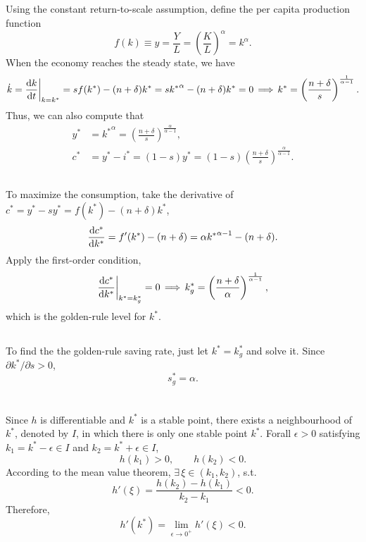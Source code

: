 \documentclass{article}
\newcommand{\kast}{k^\ast}
\newcommand{\yast}{y^\ast}
\newcommand{\cast}{c^\ast}
\begin{document}
\subsection{}
Using the constant return-to-scale assumption, define the per capita production function
\[
    f(k) \equiv y = \frac{Y}{L} = \left( \frac{K}{L} \right)^\alpha = k^\alpha.
\]
When the economy reaches the steady state, we have
\[
    \dot{k} = \frac{\dif k}{\dif t} \bigg|_{k = \kast} 
    = s f(\kast) - (n + \delta) \kast = s {\kast}^\alpha - (n + \delta) \kast = 0
    \,\Longrightarrow\,
    \kast = \left(\frac{n + \delta}{s}\right)^{\frac{1}{\alpha - 1}}.
\]
Thus, we can also compute that
\begin{align*}
    \yast &= {\kast}^\alpha = \left(\frac{n + \delta}{s}\right)^{\frac{\alpha}{\alpha - 1}}, \\
    \cast &= \yast - i^\ast = (1 - s) \yast = 
    (1 - s) \left(\frac{n + \delta}{s}\right)^{\frac{\alpha}{\alpha - 1}}.
\end{align*}

\subsection{}
To maximize the consumption, take the derivative of $\cast = \yast - s \yast = f(\kast) - (n + \delta) \kast$,
\[
    \frac{\dif \cast}{\dif \kast}
    = f'(\kast) - (n + \delta)
    = \alpha {\kast}^{\alpha - 1} - (n + \delta).
\]
Apply the first-order condition, 
\[
    \frac{\dif \cast}{\dif \kast} \bigg|_{\kast = \kast_g} = 0
    \,\Longrightarrow\,
    \kast_g = \left(\frac{n + \delta}{\alpha}\right)^{\frac{1}{\alpha - 1}},
\]
which is the golden-rule level for $\kast$.

\subsection{}
To find the the golden-rule saving rate, just let $\kast = \kast_g$ and solve it. Since $\partial \kast / \partial s > 0$,
\[
    s^\ast_g = \alpha.
\]

\section{}
Since $h$ is differentiable and $\kast$ is a stable point, there exists a neighbourhood of $\kast$, denoted by $I$, in which there is only one stable point $\kast$. Forall $\epsilon > 0$ satisfying $k_1 = \kast - \epsilon \in I$ and $k_2 = \kast + \epsilon \in I$,
\[
    h(k_1) > 0, \qquad h(k_2) < 0.
\]
According to the mean value theorem, $\exists\, \xi \in (k_1, k_2)$, s.t.
\[
    h'(\xi) = \frac{h(k_2) - h(k_1)}{k_2 - k_1} < 0.
\]
Therefore,
\[
    h'(\kast) = \lim_{\epsilon \to 0^+} h'(\xi) < 0.
\]
\end{document}
